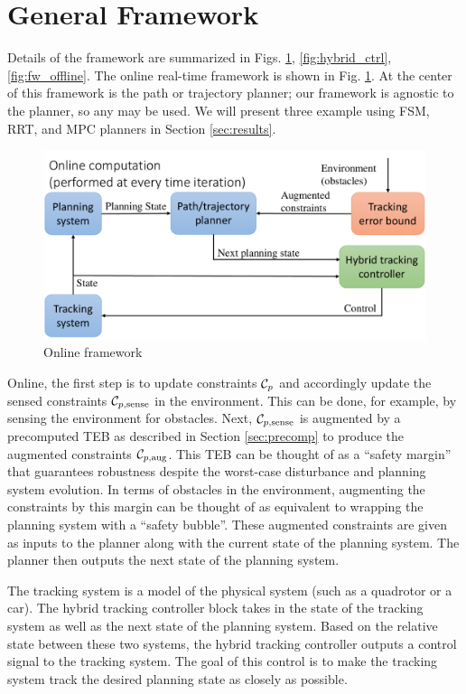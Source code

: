 \section{General Framework \label{sec:framework}}
Details of the framework are summarized in Figs. \ref{fig:fw_online}, \ref{fig:hybrid_ctrl}, \ref{fig:fw_offline}. 
The online real-time framework is shown in Fig. \ref{fig:fw_online}. 
At the center of this framework is the path or trajectory planner; our framework is agnostic to the planner, so any may be used. 
We will present three example using FSM, RRT, and MPC planners in Section \ref{sec:results}.
\begin{figure}[h!]
  \centering
	\includegraphics[width=1\columnwidth]{fig/framework_online}
	\caption{Online framework}
	\label{fig:fw_online}
\end{figure}

Online, the first step is to update constraints $\mathcal C_p$ and accordingly update the sensed constraints $\mathcal C_{p,\text{sense}}$ in the environment.
This can be done, for example, by sensing the environment for obstacles.
Next, $\mathcal C_{p,\text{sense}}$ is augmented  by a precomputed TEB as described in Section \ref{sec:precomp} to produce the augmented constraints $\mathcal C_{p,\text{aug}}$. 
This TEB can be thought of as a ``safety margin'' that guarantees robustness despite the worst-case disturbance and planning system evolution. 
In terms of obstacles in the environment, augmenting the constraints by this margin can be thought of as equivalent to wrapping the planning system with a ``safety bubble''. 
These augmented constraints are given as inputs to the planner along with the current state of the planning system. 
The planner then outputs the next state of the planning system.

The tracking system is a model of the physical system (such as a quadrotor or a car). 
The hybrid tracking controller block takes in the state of the tracking system as well as the next state of the planning system. 
Based on the relative state between these two systems, the hybrid tracking controller outputs a control signal to the tracking system. 
The goal of this control is to make the tracking system track the desired planning state as closely as possible.

